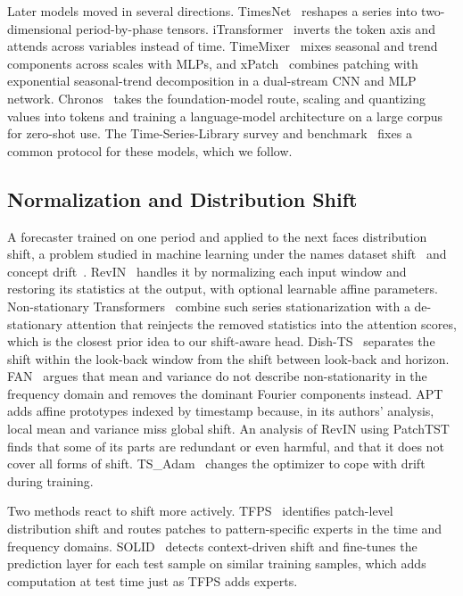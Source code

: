 Later models moved in several directions. TimesNet~\cite{timesnet} reshapes a series into two-dimensional period-by-phase tensors. iTransformer~\cite{itransformer} inverts the token axis and attends across variables instead of time. TimeMixer~\cite{timemixer} mixes seasonal and trend components across scales with MLPs, and xPatch~\cite{xpatch} combines patching with exponential seasonal-trend decomposition in a dual-stream CNN and MLP network. Chronos~\cite{chronos} takes the foundation-model route, scaling and quantizing values into tokens and training a language-model architecture on a large corpus for zero-shot use. The Time-Series-Library survey and benchmark~\cite{tslib,tslib_code} fixes a common protocol for these models, which we follow.

\subsection{Normalization and Distribution Shift}

A forecaster trained on one period and applied to the next faces distribution shift, a problem studied in machine learning under the names dataset shift~\cite{datasetshift} and concept drift~\cite{gama_drift}. RevIN~\cite{revin} handles it by normalizing each input window and restoring its statistics at the output, with optional learnable affine parameters. Non-stationary Transformers~\cite{nstransformer} combine such series stationarization with a de-stationary attention that reinjects the removed statistics into the attention scores, which is the closest prior idea to our shift-aware head. Dish-TS~\cite{dishts} separates the shift within the look-back window from the shift between look-back and horizon. FAN~\cite{fan} argues that mean and variance do not describe non-stationarity in the frequency domain and removes the dominant Fourier components instead. APT~\cite{apt} adds affine prototypes indexed by timestamp because, in its authors' analysis, local mean and variance miss global shift. An analysis of RevIN using PatchTST~\cite{revinrole} finds that some of its parts are redundant or even harmful, and that it does not cover all forms of shift. TS\_Adam~\cite{tsadam} changes the optimizer to cope with drift during training.

Two methods react to shift more actively. TFPS~\cite{tfps} identifies patch-level distribution shift and routes patches to pattern-specific experts in the time and frequency domains. SOLID~\cite{solid} detects context-driven shift and fine-tunes the prediction layer for each test sample on similar training samples, which adds computation at test time just as TFPS adds experts.

